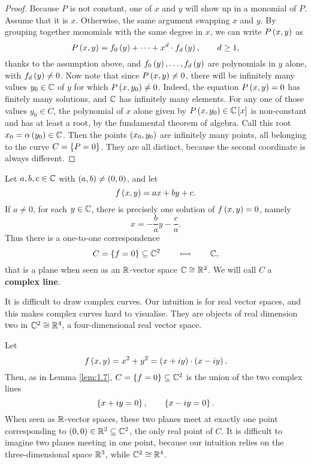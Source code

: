 \begin{proof}
Because $ P $ is not constant, one of $ x $ and $ y $ will show up in a monomial of $ P $. Assume that it is $ x $. Otherwise, the same argument swapping $ x $ and $ y $. By grouping together monomials with the same degree in $ x $, we can write $ P\br{x, y} $ as
$$ P\br{x, y} = f_0\br{y} + \dots + x^d \cdot f_d\br{y}, \qquad d \ge 1, $$
thanks to the assumption above, and $ f_0\br{y}, \dots, f_d\br{y} $ are polynomials in $ y $ alone, with $ f_d\br{y} \ne 0 $. Now note that since $ P\br{x, y} \ne 0 $, there will be infinitely many values $ y_0 \in \mathbb{C} $ of $ y $ for which $ P\br{x, y_0} \ne 0 $. Indeed, the equation $ P\br{x, y} = 0 $ has finitely many solutions, and $ \mathbb{C} $ has infinitely many elements. For any one of those values $ y_0 \in C $, the polynomial of $ x $ alone given by $ P\br{x, y_0} \in \CC\sbr{x} $ is non-constant and has at least a root, by the fundamental theorem of algebra. Call this root $ x_0 = \alpha\br{y_0} \in \CC $. Then the points $ \br{x_0, y_0} $ are infinitely many points, all belonging to the curve $ C = \cbr{P = 0} $. They are all distinct, because the second coordinate is always different.
\end{proof}

\begin{example}
Let $ a, b, c \in \mathbb{C} $ with $ \br{a, b} \ne \br{0, 0} $, and let
$$ f\br{x, y} = ax + by + c. $$
If $ a \ne 0 $, for each $ y \in \mathbb{C} $, there is precisely one solution of $ f\br{x, y} = 0 $, namely
$$ x = -\dfrac{b}{a}y - \dfrac{c}{a}. $$
Thus there is a one-to-one correspondence
$$ C = \cbr{f = 0} \subseteq \CC^2 \qquad \leftrightsquigarrow \qquad \CC, $$
that is a plane when seen as an $ \mathbb{R} $-vector space $ \mathbb{C} \cong \mathbb{R}^2 $. We will call $ C $ a \textbf{complex line}.
\end{example}

\begin{remark}
It is difficult to draw complex curves. Our intuition is for real vector spaces, and this makes complex curves hard to visualise. They are objects of real dimension two in $ \mathbb{C}^2 \cong \mathbb{R}^4 $, a four-dimensional real vector space.
\end{remark}

\begin{example}
Let
$$ f\br{x, y} = x^2 + y^2 = \br{x + iy} \cdot \br{x - iy}. $$
Then, as in Lemma \ref{lem:1.7}, $ C = \cbr{f = 0} \subseteq \CC^2 $ is the union of the two complex lines
$$ \cbr{x + iy = 0}, \qquad \cbr{x - iy = 0}. $$
When seen as $ \mathbb{R} $-vector spaces, these two planes meet at exactly one point corresponding to $ \br{0, 0} \in \RR^2 \subseteq \CC^2 $, the only real point of $ C $. It is difficult to imagine two planes meeting in one point, because our intuition relies on the three-dimensional space $ \mathbb{R}^3 $, while $ \mathbb{C}^2 \cong \mathbb{R}^4 $.
\end{example}

